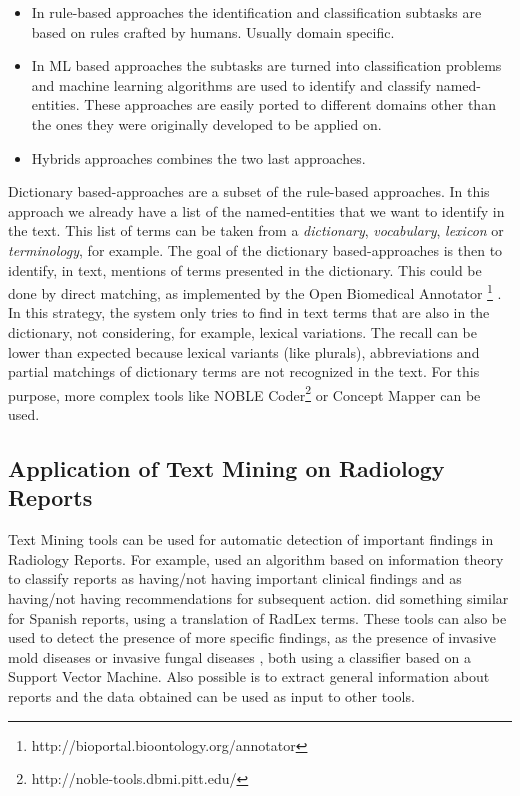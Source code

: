 \begin{itemize}
\item In rule-based approaches the identification and classification subtasks are based on rules crafted by humans. Usually domain specific. 
\item In ML based approaches the subtasks are turned into classification problems and machine learning algorithms are used to identify and classify named-entities. These approaches are easily ported to different domains other than the ones they were originally developed to be applied on.
\item Hybrids approaches combines the two last approaches.
\end{itemize}

Dictionary based-approaches are a subset of the rule-based approaches. In this approach we already have a list of the named-entities that we want to identify in the text. This list of terms can be taken from a \textit{dictionary}, \textit{vocabulary}, \textit{lexicon} or \textit{terminology}, for example. The goal of the dictionary based-approaches is then to identify, in text, mentions of terms presented in the dictionary. This could be done by direct matching, as implemented by the Open Biomedical Annotator \footnote{http://bioportal.bioontology.org/annotator} \citep{Jonquet2009}. In this strategy, the system only tries to find in text terms that are also in the dictionary, not considering, for example, lexical variations. The recall can be lower than expected because lexical variants (like plurals), abbreviations and partial matchings of dictionary terms are not recognized in the text. For this purpose, more complex tools like NOBLE Coder\footnote{http://noble-tools.dbmi.pitt.edu/} \citep{Tseytlin2016} or Concept Mapper \citep{Stewart} can be used.

\subsection{Application of Text Mining on Radiology Reports}

Text Mining tools can be used for automatic detection of important findings in Radiology Reports. For example, \citep{Dreyer2005} used an algorithm based on information theory to classify reports as having/not having important clinical findings and as having/not having recommendations for subsequent action. \citep{Cotik2015} did something similar for Spanish reports, using a translation of RadLex terms. These tools can also be used to detect the presence of more specific findings, as the presence of invasive mold diseases  \citep{Ananda-Rajah2014} or invasive fungal diseases \citep{Martinez2015}, both using a classifier based on a Support Vector Machine. Also possible is to extract general information about reports \citep{Hassanpour2016} and the data obtained can be used as input to other tools.


